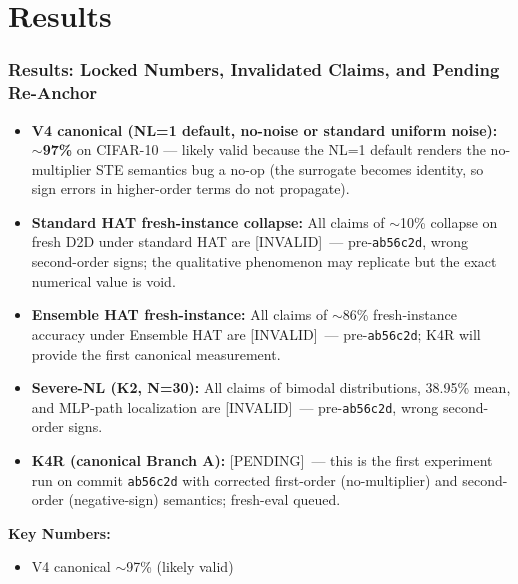 \documentclass[aspectratio=169,11pt]{beamer}
\newcommand{\dataset}[1]{\textsc{#1}}
\newcommand{\commit}[1]{\texttt{#1}}
\begin{document}

\section{Results}
\begin{frame}
  \frametitle{Results: Locked Numbers, Invalidated Claims, and Pending Re-Anchor}
  \begin{itemize}
    \item \textbf{V4 canonical (NL=1 default, no-noise or standard uniform noise):} $\sim$\textbf{97\%} on \dataset{CIFAR-10} --- likely valid because the NL=1 default renders the no-multiplier STE semantics bug a no-op (the surrogate becomes identity, so sign errors in higher-order terms do not propagate).
    \item \textbf{Standard HAT fresh-instance collapse:} All claims of $\sim$10\% collapse on fresh D2D under standard HAT are [INVALID]\ --- pre-\commit{ab56c2d}, wrong second-order signs; the qualitative phenomenon may replicate but the exact numerical value is void.
    \item \textbf{Ensemble HAT fresh-instance:} All claims of $\sim$86\% fresh-instance accuracy under Ensemble HAT are [INVALID]\ --- pre-\commit{ab56c2d}; K4R will provide the first canonical measurement.
    \item \textbf{Severe-NL (K2, N=30):} All claims of bimodal distributions, 38.95\% mean, and MLP-path localization are [INVALID]\ --- pre-\commit{ab56c2d}, wrong second-order signs.
    \item \textbf{K4R (canonical Branch A):} [PENDING]\ --- this is the first experiment run on commit \commit{ab56c2d} with corrected first-order (no-multiplier) and second-order (negative-sign) semantics; fresh-eval queued.
  \end{itemize}
  \vfill
  \textbf{Key Numbers:}
  \begin{itemize}
    \item V4 canonical $\sim$97\% \textcolor{green!60!black}{\checkmark} (likely valid)

\end{itemize}
\end{frame}
\end{document}
